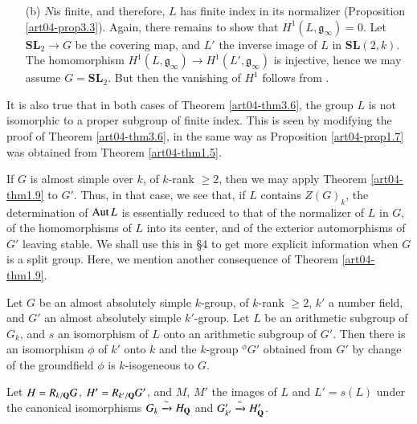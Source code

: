 \begin{itemize}
\item[(b)] $N$\pageoriginale is finite, and therefore, $L$ has finite index in its normalizer (Proposition \ref{art04-prop3.3}). Again, there remains to show that $H^{1}(L,\mathfrak{g}_{\infty})=0$. Let $\mathbf{SL}_{2}\to G$ be the covering map, and $L'$ the inverse image of $L$ in $\mathbf{SL}(2,k)$. The homomorphism $H^{1}(L,\mathfrak{g}_{\infty})\to H^{1}(L',\mathfrak{g}_{\infty})$ is injective, hence we may assume $G=\mathbf{SL}_{2}$. But then the vanishing of $H^{1}$ follows from \cite{art04-key29}.
\end{itemize}

\begin{remark*}
It is also true that in both cases of Theorem \ref{art04-thm3.6}, the group $L$ is not isomorphic to a proper subgroup of finite index. This is seen by modifying the proof of Theorem \ref{art04-thm3.6}, in the same way as Proposition \ref{art04-prop1.7} was obtained from Theorem \ref{art04-thm1.5}.
\end{remark*}

If $G$ is almost simple over $k$, of $k$-rank $\geq 2$, then we may apply Theorem \ref{art04-thm1.9} to $G'$. Thus, in that case, we see that, if $L$ contains $Z(G)_{k}$, the determination of $\operatorname{\mathrm{Aut}} L$ is essentially reduced to that of the normalizer of $L$ in $G$, of the homomorphisms of $L$ into its center, and of the exterior automorphisms of $G'$ leaving stable. We shall use this in \S4 to get more explicit information when $G$ is a split group. Here, we mention another consequence of Theorem \ref{art04-thm1.9}.

\begin{proposition}\label{art04-prop3.7}
Let $G$ be an almost absolutely simple $k$-group, of $k$-rank $\geq 2$, $k'$ a number field, and $G'$ an almost absolutely simple $k'$-group. Let $L$ be an arithmetic subgroup of $G_{k}$, and $s$ an isomorphism of $L$ onto an arithmetic subgroup of $G'$. Then there is an isomorphism $\phi$ of $k'$ onto $k$ and the $k$-group ${}^{\phi}G'$ obtained from $G'$ by change of the groundfield $\phi$ is $k$-isogeneous to $G$.
\end{proposition}

Let $H=R_{k/\mathbf{Q}}G$, $H'=R_{k'/\mathbf{Q}}G'$, and $M$, $M'$ the images of $L$ and $L'=s(L)$ under the canonical isomorphisms $G_{k}\xrightarrow{\sim}H_{\mathbf{Q}}$ and $G'_{k'}\xrightarrow{\sim}H'_{\mathbf{Q}}$.

